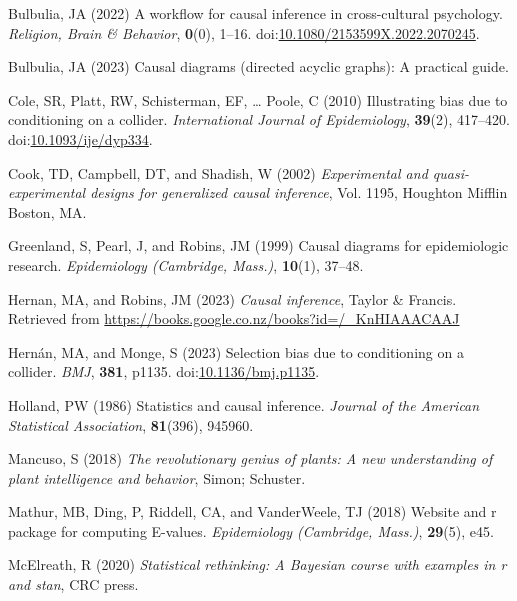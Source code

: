 \documentclass[
  singlecolumn]{article}
\newlength{\cslhangindent}
\newenvironment{CSLReferences}[2] %
 {\begin{list}{}{%
  \setlength{\itemindent}{0pt}
  \setlength{\leftmargin}{0pt}
  \setlength{\parsep}{0pt}
  \ifodd #1
   \setlength{\leftmargin}{\cslhangindent}
   \setlength{\itemindent}{-1\cslhangindent}
  \fi
  \setlength{\itemsep}{#2\baselineskip}}}
 {\end{list}}
\begin{document}
\label{refs}
\begin{CSLReferences}{1}{0}
Bulbulia, JA (2022) A workflow for causal inference in cross-cultural
psychology. \emph{Religion, Brain \& Behavior}, \textbf{0}(0), 1--16.
doi:\href{https://doi.org/10.1080/2153599X.2022.2070245}{10.1080/2153599X.2022.2070245}.

Bulbulia, JA (2023) Causal diagrams (directed acyclic graphs): A
practical guide.

Cole, SR, Platt, RW, Schisterman, EF, \ldots{} Poole, C (2010)
Illustrating bias due to conditioning on a collider. \emph{International
Journal of Epidemiology}, \textbf{39}(2), 417--420.
doi:\href{https://doi.org/10.1093/ije/dyp334}{10.1093/ije/dyp334}.

Cook, TD, Campbell, DT, and Shadish, W (2002) \emph{Experimental and
quasi-experimental designs for generalized causal inference}, Vol. 1195,
Houghton Mifflin Boston, MA.

Greenland, S, Pearl, J, and Robins, JM (1999) Causal diagrams for
epidemiologic research. \emph{Epidemiology (Cambridge, Mass.)},
\textbf{10}(1), 37--48.

Hernan, MA, and Robins, JM (2023) \emph{Causal inference}, Taylor \&
Francis. Retrieved from
\url{https://books.google.co.nz/books?id=/_KnHIAAACAAJ}

Hernán, MA, and Monge, S (2023) Selection bias due to conditioning on a
collider. \emph{BMJ}, \textbf{381}, p1135.
doi:\href{https://doi.org/10.1136/bmj.p1135}{10.1136/bmj.p1135}.

Holland, PW (1986) Statistics and causal inference. \emph{Journal of the
American Statistical Association}, \textbf{81}(396), 945960.

Mancuso, S (2018) \emph{The revolutionary genius of plants: A new
understanding of plant intelligence and behavior}, Simon; Schuster.

Mathur, MB, Ding, P, Riddell, CA, and VanderWeele, TJ (2018) Website and
r package for computing {E}-values. \emph{Epidemiology (Cambridge,
Mass.)}, \textbf{29}(5), e45.

McElreath, R (2020) \emph{Statistical rethinking: A {B}ayesian course
with examples in r and stan}, CRC press.


\end{CSLReferences}
\end{document}
